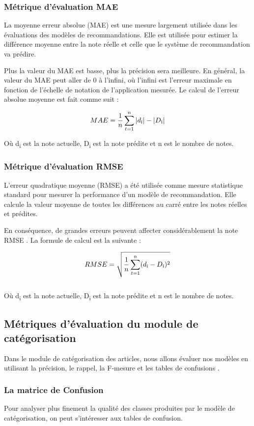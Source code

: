         \subsubsection{Métrique d'évaluation MAE}
        La moyenne erreur absolue (MAE) est une mesure largement utilisée dans les évaluations des modèles de recommandations. Elle est utilisée pour estimer la différence moyenne entre la note réelle et celle que le système de recommandation va prédire. 

        Plus la valeur du MAE est basse, plus la précision sera meilleure. En général, la valeur du MAE peut aller de 0 à l'infini, où l'infini est l'erreur maximale en fonction de l'échelle de notation de l'application mesurée. Le calcul de l'erreur absolue moyenne est fait comme suit \cite{rmse}:

        \[MAE = \frac{1}{n}\sum_{t=1}^{n}|d\textsubscript{i}|-|D\textsubscript{i}|\]

        Où d\textsubscript{i} est la note actuelle, D\textsubscript{i} est la note prédite et n est le nombre de notes.

        \subsubsection{Métrique d'évaluation RMSE}
        L'erreur quadratique moyenne (RMSE) a été utilisée comme mesure statistique standard pour mesurer la performance d'un modèle de recommandation. Elle  calcule la valeur moyenne de toutes les différences au carré entre les notes réelles et prédites. 

        En conséquence, de grandes erreurs peuvent affecter considérablement la note RMSE \cite{rmse}. La formule de calcul est la suivante :

        \[RMSE = \sqrt{\frac{1}{n}\sum_{t=1}^{n}(d\textsubscript{i} - D\textsubscript{i})^2}\] \\

        Où d\textsubscript{i} est la note actuelle, D\textsubscript{i} est la note prédite et n est le nombre de notes.

    \subsection{Métriques d'évaluation du module de catégorisation}
    Dans le module de catégorisation des articles, nous allons évaluer nos modèles en utilisant la précision, le rappel, la F-mesure et les tables de confusions \cite{mesurecateg}.
        \subsubsection{La matrice de Confusion}
        Pour analyser plus finement la qualité des classes produites par le modèle de catégorisation, on peut s’intéresser aux tables de confusion. 
        
